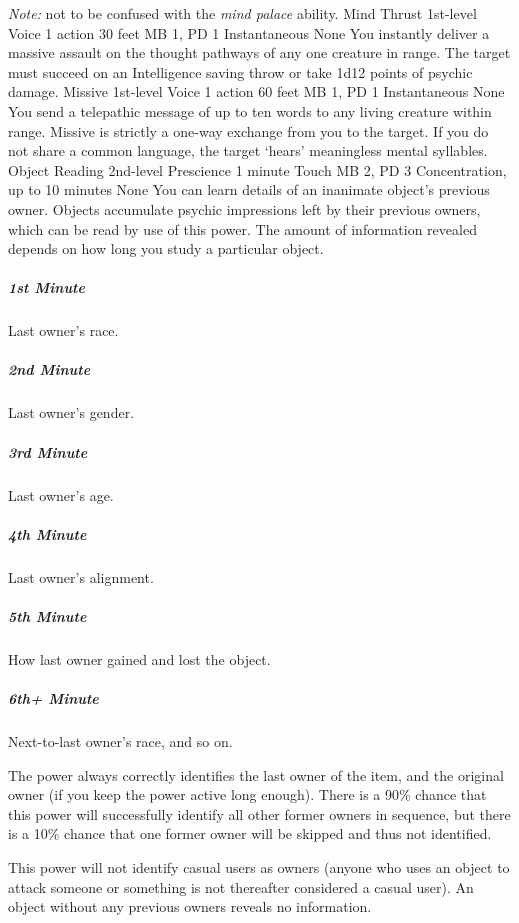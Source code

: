 \emph{Note:} not to be confused with the \emph{mind palace} ability.
\DndPowerHeader%
    {Mind Thrust\label{pwr:mind-thrust}}
    {1st-level Voice}
    {1 action}
    {30 feet}
    {MB 1, PD 1}
    {Instantaneous}
    {None}
You instantly deliver a massive assault on
the thought pathways of any one creature in range. The target
must succeed on an Intelligence saving throw or take 1d12
points of psychic damage.
\DndPowerHeader%
    {Missive\label{pwr:missive}}
    {1st-level Voice}
    {1 action}
    {60 feet}
    {MB 1, PD 1}
    {Instantaneous}
    {None}
You send a telepathic message of up to ten
words to any living creature within range. Missive is strictly
a one-way exchange from you to the target. If you do not share
a common language, the target `hears' meaningless mental
syllables.
\DndPowerHeader%
    {Object Reading\label{pwr:object-reading}}
    {2nd-level Prescience}
    {1 minute}
    {Touch}
    {MB 2, PD 3}
    {Concentration, up to 10 minutes}
    {None}
You can learn details of an inanimate object's
previous owner.
Objects accumulate psychic impressions
left by their previous owners,
which can be read by use of this power.
The amount of information revealed depends
on how long you study a particular object.

\subparagraph{1st Minute}
  Last owner's race.

\subparagraph{2nd Minute}
  Last owner's gender.

\subparagraph{3rd Minute}
  Last owner's age.

\subparagraph{4th Minute}
  Last owner's alignment.

\subparagraph{5th Minute}
  How last owner gained and lost the object.

\subparagraph{6th+ Minute}
  Next-to-last owner's race, and so on.

The power always correctly identifies the last owner of the item,
and the original owner
(if you keep the power active long enough).
There is a 90\% chance
that this power will successfully identify all other former owners
in sequence,
but there is a 10\% chance that one former owner
will be skipped and thus not identified.

This power will not identify casual users as owners
(anyone who uses an object to attack someone
or something is not thereafter considered a casual user).
An object without any previous owners reveals no information.

